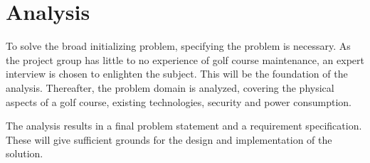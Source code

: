 
\chapter{Analysis}
To solve the broad initializing problem, specifying the problem is necessary. As the project group has little to no experience of golf course maintenance, an expert interview is chosen to enlighten the subject. This will be the foundation of the analysis. Thereafter, the problem domain is analyzed, covering the physical aspects of a golf course, existing technologies, security and power consumption.

The analysis results in a final problem statement and a requirement specification. These will give sufficient grounds for the design and implementation of the solution.






